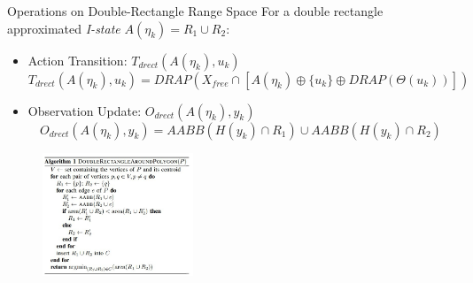 \begin{frame}{Operations on Double-Rectangle Range Space}
  For a double rectangle approximated \emph{I-state} $A(\eta_k) = R_1 \cup R_2$:
  \begin{itemize}
  \item Action Transition: $T_{drect}\left(A(\eta_k), u_k \right) $\\
    \scriptsize{$$T_{drect}\left(A(\eta_k), u_k \right)=DRAP\left(X_{free} \cap [A(\eta_k) \oplus \{ u_k \} \oplus DRAP\left(\Theta(u_k)\right)]\right)$$}
  \item Observation Update: $O_{drect}\left(A(\eta_k), y_k\right) $\\
    \scriptsize{$$O_{drect}\left(A(\eta_k), y_k\right)=AABB\left(H(y_k) \cap R_1\right)\cup AABB\left(H(y_k) \cap R_2\right)$$ }
  \end{itemize}
  \begin{figure}
    \centering
    \includegraphics[width=0.4\textwidth]{figs/algorithm.jpg}
  \end{figure} 
\end{frame}

